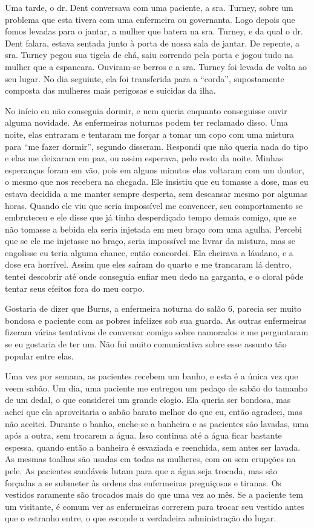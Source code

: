 Uma tarde, o dr. Dent conversava com uma paciente, a sra. Turney, sobre
um problema que esta tivera com uma enfermeira ou governanta. Logo
depois que fomos levadas para o jantar, a mulher que batera na sra.
Turney, e da qual o dr. Dent falara, estava sentada junto à porta de
nossa sala de jantar. De repente, a sra. Turney pegou sua tigela de chá,
saiu correndo pela porta e jogou tudo na mulher que a espancara.
Ouviram-se berros e a sra. Turney foi levada de volta ao seu lugar. No
dia seguinte, ela foi transferida para a ``corda'', supostamente
composta das mulheres mais perigosas e suicidas da ilha.

No início eu não conseguia dormir, e nem queria enquanto conseguisse
ouvir alguma novidade. As enfermeiras noturnas podem ter reclamado
disso. Uma noite, elas entraram e tentaram me forçar a tomar um copo com
uma mistura para ``me fazer dormir'', segundo disseram. Respondi que não
queria nada do tipo e elas me deixaram em paz, ou assim esperava, pelo
resto da noite. Minhas esperanças foram em vão, pois em alguns minutos
elas voltaram com um doutor, o mesmo que nos recebera na chegada. Ele
insistiu que eu tomasse a dose, mas eu estava decidida a me manter
sempre desperta, sem descansar mesmo por algumas horas. Quando ele viu
que seria impossível me convencer, seu comportamento se embruteceu e ele
disse que já tinha desperdiçado tempo demais comigo, que se não tomasse
a bebida ela seria injetada em meu braço com uma agulha. Percebi que se
ele me injetasse no braço, seria impossível me livrar da mistura, mas se
engolisse eu teria alguma chance, então concordei. Ela cheirava a
láudano, e a dose era horrível. Assim que eles saíram do quarto e me
trancaram lá dentro, tentei descobrir até onde conseguia enfiar meu dedo
na garganta, e o cloral pôde tentar seus efeitos fora do meu corpo.

Gostaria de dizer que Burns, a enfermeira noturna do salão 6, parecia
ser muito bondosa e paciente com as pobres infelizes sob sua guarda. As
outras enfermeiras fizeram várias tentativas de conversar comigo sobre
namorados e me perguntaram se eu gostaria de ter um. Não fui muito
comunicativa sobre esse assunto tão popular entre elas.

Uma vez por semana, as pacientes recebem um banho, e esta é a única vez
que veem sabão. Um dia, uma paciente me entregou um pedaço de sabão do
tamanho de um dedal, o que considerei um grande elogio. Ela queria ser
bondosa, mas achei que ela aproveitaria o sabão barato melhor do que eu,
então agradeci, mas não aceitei. Durante o banho, enche-se a banheira e
as pacientes são lavadas, uma após a outra, sem trocarem a água. Isso
continua até a água ficar bastante espessa, quando então a banheira é
esvaziada e reenchida, sem antes ser lavada. As mesmas toalhas são
usadas em todas as mulheres, com ou sem erupções na pele. As pacientes
saudáveis lutam para que a água seja trocada, mas são forçadas a se
submeter às ordens das enfermeiras preguiçosas e tiranas. Os vestidos
raramente são trocados mais do que uma vez ao mês. Se a paciente tem um
visitante, é comum ver as enfermeiras correrem para trocar seu vestido
antes que o estranho entre, o que esconde a verdadeira administração do
lugar.

